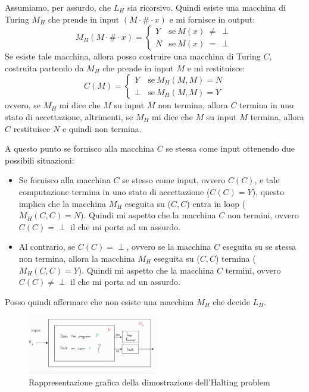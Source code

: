 \begin{dimostrazione}
    Assumiamo, per assurdo, che $L_H$ sia ricorsivo. Quindi esiste una macchina
    di Turing $M_H$ che prende in input $(M \cdot \# \cdot x)$ e mi fornisce in
    output:
    \begin{equation}
        M_H (M \cdot \# \cdot x) = \begin{cases}
            Y & \text{se} \ M(x) \ \neq \ \perp \\
            N & \text{se} \ M(x) \  = \ \perp
        \end{cases}
    \end{equation}
    Se esiste tale macchina, allora posso costruire una macchina di Turing $C$,
    costruita partendo da $M_H$ che prende in input $M$ e mi restituisce:
    \begin{equation}
        C(M) = \begin{cases}
            Y & \text{se} \ M_H(M, M) = N \\
            \perp & \text{se} \ M_H(M, M) = Y
        \end{cases}
    \end{equation}
    ovvero, se $M_H$ mi dice che $M$ su input $M$ non termina, allora $C$ termina
    in uno stato di accettazione, altrimenti, se $M_H$ mi dice che $M$ su input
    $M$ termina, allora $C$ restituisce $N$ e quindi non termina.

    A questo punto se fornisco alla macchina $C$ se stessa come input ottenendo
    due possibili situazioni:
    \begin{itemize}
        \item Se fornisco alla macchina $C$ se stesso come input, ovvero $C(C)$,
              e tale computazione termina in uno stato di accettazione ($C(C) = Y$),
              questo implica che la macchina $M_H$ eseguita su ($C, C$) entra in
              loop ($M_H(C, C) = N$). Quindi mi aspetto che la macchina $C$ non
              termini, ovvero $C(C) = \perp$ il che mi porta ad un assurdo.
        \item Al contrario, se $C(C) = \perp$, ovvero se la macchina $C$ eseguita su
              se stessa non termina, allora la macchina $M_H$ eseguita su ($C, C$)
              termina ($M_H(C, C) = Y$). Quindi mi aspetto che la macchina $C$
              termini, ovvero $C(C) \neq \perp$ il che mi porta ad un assurdo.
    \end{itemize}
    Posso quindi affermare che non esiste una macchina $M_H$ che decide $L_H$.
    \begin{figure}[!ht]
        \centering
        \includegraphics[width=0.5\textwidth]{img/MacchineTuring/halt.png}
        \caption{Rappresentazione grafica della dimostrazione dell'Halting problem}
    \end{figure}
\end{dimostrazione}

